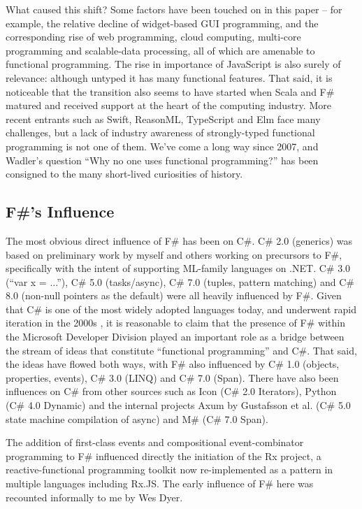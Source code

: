 \documentclass[acmsmall,review]{acmart}\settopmatter{printfolios=true,printccs=false,printacmref=false}
\begin{document}
What caused this shift? Some factors have been touched on in this paper – for example, the relative decline of widget-based GUI programming, and the corresponding rise of web programming, cloud computing, multi-core programming and scalable-data processing, all of which are amenable to functional programming. The rise in importance of JavaScript is also surely of relevance: although untyped it has many functional features. That said, it is noticeable that the transition also seems to have started when Scala and F\# matured and received support at the heart of the computing industry. More recent entrants such as Swift, ReasonML, TypeScript and Elm face many challenges, but a lack of industry awareness of strongly-typed functional programming is not one of them. We’ve come a long way since 2007, and Wadler’s question “Why no one uses functional programming?” has been consigned to the many short-lived curiosities of history.

\subsection*{F\#'s Influence}

The most obvious direct influence of F\# has been on C\#. C\# 2.0 (generics) was based on preliminary work by myself and others working on precursors to F\#, specifically with the intent of supporting ML-family languages on .NET. C\# 3.0 (“var x = ...”), C\# 5.0 (tasks/async), C\# 7.0 (tuples, pattern matching) and C\# 8.0 (non-null pointers as the default) were all heavily influenced by F\#.  Given that C\# is one of the most widely adopted languages today, and underwent rapid iteration in the 2000s , it is reasonable to claim that the presence of F\# within the Microsoft Developer Division played an important role as a bridge between the stream of ideas that constitute “functional programming” and C\#.   That said, the ideas have flowed both ways, with F\# also influenced by C\# 1.0 (objects, properties, events), C\# 3.0 (LINQ) and C\# 7.0 (Span). There have also been influences on C\# from other sources such as Icon (C\# 2.0 Iterators), Python (C\# 4.0 Dynamic) and the internal projects Axum by Gustafsson et al.  (C\# 5.0 state machine compilation of async) and M\#  (C\# 7.0 Span). 

The addition of first-class events and compositional event-combinator programming to F\# influenced directly the initiation of the Rx project, a reactive-functional programming toolkit now re-implemented as a pattern in multiple languages including Rx.JS.   The early influence of F\# here was recounted informally to me by Wes Dyer. 
\end{document}
